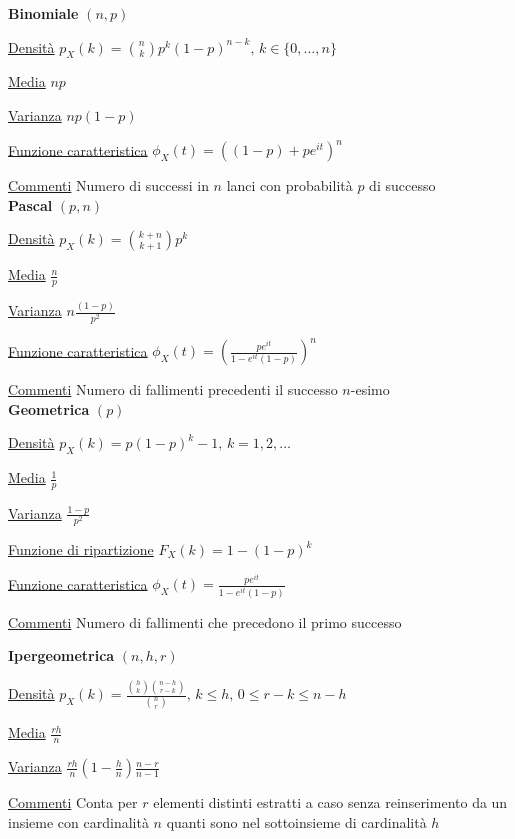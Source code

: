 \documentclass[openany]{book} %
\begin{document}
\begin{multicols}{2}

\textbf{Binomiale} $(n,p)$  

\underline{Densità} $p_X(k) = \binom {n}{k}p^k(1-p)^{n-k},\,k \in \{0,\dots,n\}$

\underline{Media} $np$

\underline{Varianza} $np(1-p)$

\underline{Funzione caratteristica} $\phi_X(t)=((1-p)+pe^{it})^n$

\underline{Commenti} Numero di successi in $n$ lanci con probabilità $p$ di successo
\\

\textbf{Pascal} $(p,n)$

\underline{Densità} $p_X(k) = \binom {k+n}{k+1}p^k$

\underline{Media} $\frac{n}{p}$

\underline{Varianza} $n\frac{(1-p)}{p^2}$

\underline{Funzione caratteristica} $\phi_X(t)=\left(\frac{pe^{it}}{1-e^{it}(1-p)}\right)^n$

\underline{Commenti} Numero di fallimenti precedenti il successo $n$-esimo
\\

\textbf{Geometrica} $(p)$

\underline{Densità} $p_X(k) = p(1-p)^k-1, \, k =1,2,\dots$

\underline{Media} $\frac{1}{p}$

\underline{Varianza} $\frac{1-p}{p^2}$

\underline{Funzione di ripartizione} $F_X(k)=1-(1-p)^k$

\underline{Funzione caratteristica} $\phi_X(t)= \frac{pe^{it}}{1-e^{it}(1-p)}$

\underline{Commenti} Numero di fallimenti che precedono il primo successo

\columnbreak

\textbf{Ipergeometrica} $(n,h,r)$

\underline{Densità} $p_X(k) = \frac{\binom {h}{k}\binom {n-h}{r-k}}{\binom {n}{r}},\,k\leq h,\,0\leq r-k\leq n-h$

\underline{Media} $\frac{rh}{n}$

\underline{Varianza} $\frac{rh}{n}\left(1-\frac{h}{n}\right)\frac{n-r}{n-1}$

\underline{Commenti} Conta per $r$ elementi distinti estratti a caso senza reinserimento da un insieme con cardinalità $n$ quanti sono nel sottoinsieme di cardinalità $h$
\\


\end{multicols}
\end{document}
